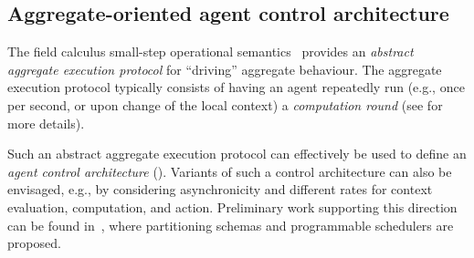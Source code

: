\subsection{Aggregate-oriented agent control architecture}
\label{mdpi2020:contrib-ac-control-arch}

%
The field calculus small-step operational semantics~\cite{audrito2019tocl}
 provides an \emph{abstract aggregate execution protocol}
 for ``driving'' aggregate behaviour.
%
The aggregate execution protocol typically consists
 of having an agent repeatedly run (e.g., once per second, or upon change of the local context) 
 a \emph{computation round} (see  for more details).
%

Such an abstract aggregate execution protocol %
 can effectively be used to define an \emph{agent control architecture} ().
%
Variants of such a control architecture can also be envisaged,
 e.g.,
 by considering 
 asynchronicity and  
 different rates for context evaluation,
 computation,
 and action.
%
Preliminary work supporting this direction can be found in~\cite{DBLP:journals/fi/CasadeiPPVW20,DBLP:journals/corr/abs-2012-13806},
 where partitioning schemas and programmable schedulers are proposed.

